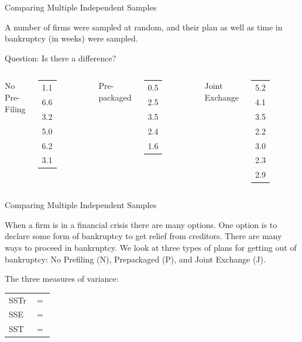 \begin{frame}{Comparing Multiple Independent Samples}

  A number of firms were sampled at random, and their plan as well as
  time in bankruptcy (in weeks) were sampled.

  \vfill
  Question: Is there a difference?


  \begin{columns}[t]
    No Pre-Filing \\
    \begin{tabular}{l}
      1.1 \\ 6.6  \\ 3.2 \\ 5.0  \\ 6.2 \\ 3.1
    \end{tabular}
    Pre-packaged \\
    \begin{tabular}{l}
      0.5 \\ 2.5 \\ 3.5 \\ 2.4 \\ 1.6
    \end{tabular}
    Joint Exchange \\
    \begin{tabular}{l}
      5.2 \\ 4.1 \\ 3.5 \\ 2.2 \\ 3.0 \\ 2.3 \\ 2.9
    \end{tabular}

  \end{columns}


\end{frame}


\begin{frame}{Comparing Multiple Independent Samples}

  When a firm is in a financial crisis there are many options. One
  option is to declare some form of bankruptcy to get relief from
  creditors. There are many ways to proceed in bankruptcy. We look at
  three types of plans for getting out of bankruptcy: No Prefiling (N),
  Prepackaged (P), and Joint Exchange (J).

  \vfill

  The three measures of variance: \\
  \begin{tabular}{ll}
    SSTr & $=$ \\ %
    SSE  & $=$ \\ %
    SST  & $=$ \\ %
  \end{tabular}


\end{frame}

